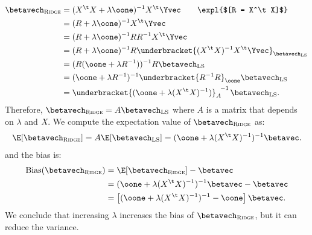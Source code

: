 \begin{equation}
    \begin{aligned}
        \betavech_{\textsc{Ridge}} & = (X^\t X + \lambda\oone)^{-1} X^\t \Yvec\qquad\expl{$[R = X^\t X]$}                          \\
                                   & = (R + \lambda\oone)^{-1} X^\t \Yvec                                                          \\
                                   & = (R + \lambda\oone)^{-1} R R^{-1} X^\t \Yvec                                                 \\
                                   & = (R + \lambda\oone)^{-1} R \underbracket{(X^\t X)^{-1} X^\t \Yvec}_{\betavech_{\text{LS}}} \\
                                   & = (R(\oone + \lambda R^{-1}))^{-1} R \betavech_{\text{LS}}                                  \\
                                   & = (\oone + \lambda R^{-1})^{-1} \underbracket{R^{-1} R}_{\oone}\betavech_{\text{LS}}        \\
                                   & = {\underbracket{(\oone + \lambda(X^\t X)^{-1})}_{A}}^{\!-1\,} \betavech_{\text{LS}}.
    \end{aligned}
\end{equation}
Therefore, $\betavech_{\textsc{Ridge}} = A \betavech_{\text{LS}}$ where $A$ is a matrix that depends on $\lambda$ and $X\negthinspace$. We compute the expectation value of $\betavech_{\textsc{Ridge}}$ as:
\begin{equation}
    \E[\betavech_{\textsc{Ridge}}] = A \E[\betavech_{\text{LS}}] = (\oone + \lambda(X^\t X)^{-1})^{-1} \betavec.
\end{equation}
and the bias is:
\begin{equation}
    \begin{aligned}
        \text{Bias}(\betavech_{\textsc{Ridge}}) & = \E[\betavech_{\textsc{Ridge}}] - \betavec                            \\
                                                  & = (\oone + \lambda(X^\t X)^{-1})^{-1} \betavec - \betavec              \\
                                                  & = \left[ (\oone + \lambda(X^\t X)^{-1})^{-1} - \oone \right] \betavec.
    \end{aligned}
\end{equation}
We conclude that increasing $\lambda$ increases the bias of $\betavech_{\textsc{Ridge}}$, but it can reduce the variance.

